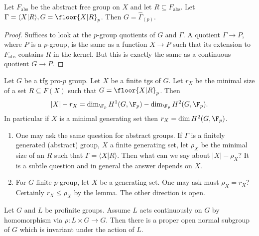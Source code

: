 \documentclass[a4paper]{article}
\begin{document}
\begin{lemma}
  Let \(F_{\mathrm{abs}}\) be the abstract free group on \(X\) and let \(R \subseteq F_{\mathrm{abs}}\). Let \(\Gamma = \langle X | R\rangle, G = \floor{X|R}_p\). Then \(G = \hat \Gamma_{(p)}\).
\end{lemma}

\begin{proof}
  Suffices to look at the \(p\)-group quotients of \(G\) and \(\Gamma\). A quotient \(\Gamma \to P\), where \(P\) is a \(p\)-group, is the same as a function \(X \to P\) such that its extension to \(F_{\mathrm{abs}}\) contains \(R\) in the kernel. But this is exactly the same as a continuous quotient \(G \to P\).
\end{proof}

\begin{theorem}
  \label{thm:size of generators and relators of pro-p group}
  Let \(G\) be a tfg pro-\(p\) group. Let \(X\) be a finite tgs of \(G\). Let \(r_X\) be the minimal size of a set \(R \subseteq F(X)\) such that \(G = \floor{X|R}_p\). Then
  \[
    |X| - r_X = \dim_{\F_p} H^1(G, \F_p) - \dim_{\F_p} H^2(G, \F_p).
  \]
  In particular if \(X\) is a minimal generating set then \(r_X = \dim H^2(G, \F_p)\).
\end{theorem}

\begin{remark}\leavevmode
  \begin{enumerate}
  \item One may ask the same question for abstract groups. If \(\Gamma\) is a finitely generated (abstract) group, \(X\) a finite generating set, let \(\rho_X\) be the minimal size of an \(R\) such that \(\Gamma = \langle X| R\rangle\). Then what can we say about \(|X| - \rho_X\)? It is a subtle question and in general the answer depends on \(X\).
  \item For \(G\) finite \(p\)-group, let \(X\) be a generating set. One may ask must \(\rho_X = r_X\)? Certainly \(r_X \leq \rho_X\) by the lemma. The other direction is open.
  \end{enumerate}
\end{remark}

\begin{lemma}
  Let \(G\) and \(L\) be profinite groups. Assume \(L\) acts continuously on \(G\) by homomorphism via \(\rho: L \times G \to G\). Then there is a proper open normal subgroup of \(G\) which is invariant under the action of \(L\).
\end{lemma}
\end{document}
